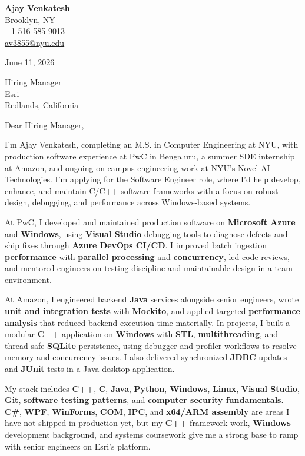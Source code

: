 \documentclass[letterpaper,11pt]{article}
\begin{document}
\begin{flushleft}
\textbf{\large Ajay Venkatesh} \\
Brooklyn, NY \\
+1 516 585 9013 \\
\href{mailto:av3855@nyu.edu}{av3855@nyu.edu}
\end{flushleft}
\vspace{10pt}
June 11, 2026
\vspace{6pt}

Hiring Manager \\
Esri \\
Redlands, California

\vspace{10pt}

Dear Hiring Manager,

I'm Ajay Venkatesh, completing an M.S. in Computer Engineering at NYU, with production software experience at PwC in Bengaluru, a summer SDE internship at Amazon, and ongoing on-campus engineering work at NYU's Novel AI Technologies. I'm applying for the Software Engineer role, where I'd help develop, enhance, and maintain C/C++ software frameworks with a focus on robust design, debugging, and performance across Windows-based systems.

At PwC, I developed and maintained production software on \textbf{Microsoft Azure} and \textbf{Windows}, using \textbf{Visual Studio} debugging tools to diagnose defects and ship fixes through \textbf{Azure DevOps CI/CD}. I improved batch ingestion \textbf{performance} with \textbf{parallel processing} and \textbf{concurrency}, led code reviews, and mentored engineers on testing discipline and maintainable design in a team environment.

At Amazon, I engineered backend \textbf{Java} services alongside senior engineers, wrote \textbf{unit and integration tests} with \textbf{Mockito}, and applied targeted \textbf{performance analysis} that reduced backend execution time materially. In projects, I built a modular \textbf{C++} application on \textbf{Windows} with \textbf{STL}, \textbf{multithreading}, and thread-safe \textbf{SQLite} persistence, using debugger and profiler workflows to resolve memory and concurrency issues. I also delivered synchronized \textbf{JDBC} updates and \textbf{JUnit} tests in a Java desktop application.

My stack includes \textbf{C++}, \textbf{C}, \textbf{Java}, \textbf{Python}, \textbf{Windows}, \textbf{Linux}, \textbf{Visual Studio}, \textbf{Git}, \textbf{software testing patterns}, and \textbf{computer security fundamentals}. \textbf{C\#}, \textbf{WPF}, \textbf{WinForms}, \textbf{COM}, \textbf{IPC}, and \textbf{x64/ARM assembly} are areas I have not shipped in production yet, but my \textbf{C++} framework work, \textbf{Windows} development background, and systems coursework give me a strong base to ramp with senior engineers on Esri's platform.
\end{document}
